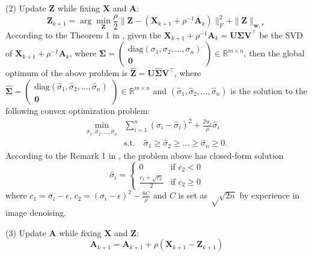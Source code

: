 \documentclass[10pt,twocolumn,letterpaper]{article}
\begin{document}
(2) Update $\mathbf{Z}$ while fixing $\mathbf{X}$ and $\mathbf{A}$:
\begin{equation}
\mathbf{Z}_{k+1}
=
\arg\min_{\mathbf{Z}}\frac{\rho}{2}
\|\mathbf{Z} - (\mathbf{X}_{k+1}+\rho^{-1}\mathbf{A}_{k})\|_{F}^{2}
+
\|\mathbf{Z}\|_{\bm{w},*}
\end{equation}
According to the Theorem 1 in \cite{wnnmijcv}, given the $\mathbf{X}_{k+1}+\rho^{-1}\mathbf{A}_{k}=\mathbf{U}\mathbf{\Sigma}\mathbf{V}^{\top}$ be the SVD of $\mathbf{X}_{k+1}+\rho^{-1}\mathbf{A}_{k}$, where $\mathbf{\Sigma}=
\left( \begin{array}{c}
\text{diag}(\sigma_{1},\sigma_{2},...,\sigma_{n})
\\
\mathbf{0}
\end{array} \right)
\in\mathbb{R}^{m\times n}$,
then the global optimum of the above problem is 
$\hat{\mathbf{Z}}=\mathbf{U}\hat{\mathbf{\Sigma}}\mathbf{V}^{\top}$, where 
$\hat{\mathbf{\Sigma}}=
\left( \begin{array}{c}
\text{diag}(\hat{\sigma}_{1},\hat{\sigma}_{2},...,\hat{\sigma}_{n})
\\
\mathbf{0}
\end{array} \right)
\in\mathbb{R}^{m\times n}$
and $(\hat{\sigma}_{1},\hat{\sigma}_{2},...,\hat{\sigma}_{n})$ is the solution to the following convex optimization problem:
\begin{equation}
\begin{split}
\min_{\hat{\sigma}_{1},\hat{\sigma}_{2},...,\hat{\sigma}_{n}}
&
\sum_{i=1}^{n}
(\sigma_{i}-\hat{\sigma}_{i})^{2}
+
\frac{2w_{i}}{\rho}\hat{\sigma}_{i}
\\
&
\text{s.t.}
\quad
\hat{\sigma}_{1}\ge \hat{\sigma}_{2} \ge...\ge \hat{\sigma}_{n}\ge 0.
\end{split}
\end{equation}
According to the Remark 1 in \cite{wnnmijcv}, the problem above has closed-form solution
\begin{equation}
\hat{\sigma}_{i}
=
\left\{ \begin{array}{ll}
0 & \textrm{if $c_{2}<0$}\\
\frac{c_{1}+\sqrt{c_{2}}}{2} & \textrm{if $c_{2}\ge 0$}
\end{array} \right.
\end{equation}
where $c_{1}=\sigma_{i}-\epsilon$, $c_{2} = (\sigma_{i}-\epsilon)^{2}-\frac{8C}{\rho}$ and $C$ is set as $√
\sqrt{2n}$ by experience in image denoising.
 
(3) Update $\mathbf{A}$ while fixing $\mathbf{X}$ and $\mathbf{Z}$:
\begin{equation}
\mathbf{A}_{k+1}
=
\mathbf{A}_{k+1} + \rho(\mathbf{X}_{k+1}-\mathbf{Z}_{k+1})
\end{equation}
\end{document}
